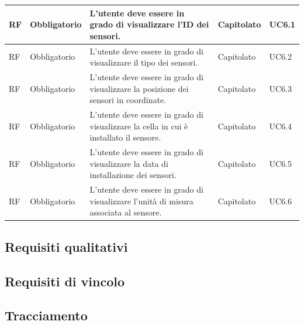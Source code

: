 \documentclass{article}
\begin{document}
\begin{longtable}{|C{1cm}|C{2cm}|>{\raggedright}m{5cm}|C{1.5cm}|C{2cm}|}
    \hline
     RF & Obbligatorio        & L'utente deve essere in grado di visualizzare l'ID dei sensori.                                                                                                                                                                    & Capitolato      & UC6.1               \\
    \hline
     RF & Obbligatorio        & L'utente deve essere in grado di visualizzare il tipo dei sensori.                                                                                                                                                                 & Capitolato      & UC6.2               \\
    \hline
     RF & Obbligatorio        & L'utente deve essere in grado di visualizzare la posizione dei sensori in coordinate.                                                                                                                                                            & Capitolato      & UC6.3               \\
    \hline
     RF & Obbligatorio        & L'utente deve essere in grado di visualizzare la cella in cui è installato il sensore.                                                                                                                                                & Capitolato      & UC6.4               \\
    \hline
     RF & Obbligatorio        & L'utente deve essere in grado di visualizzare la data di installazione dei sensori.                                                                                                                                                & Capitolato      & UC6.5               \\
    \hline
     RF & Obbligatorio        & L'utente deve essere in grado di visualizzare l'unità di misura associata al sensore.                                                                                                                                              & Capitolato      & UC6.6               \\
    \hline
\end{longtable}
\subsection{Requisiti qualitativi}
\subsection{Requisiti di vincolo}
\subsection{Tracciamento}
\end{document}
